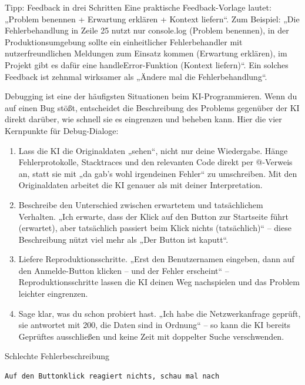 \begin{tcbinfo}{Tipp: Feedback in drei Schritten}
Eine praktische Feedback-Vorlage lautet: „Problem benennen + Erwartung erklären + Kontext liefern“. Zum Beispiel: „Die Fehlerbehandlung in Zeile 25 nutzt nur console.log (Problem benennen), in der Produktionsumgebung sollte ein einheitlicher Fehlerbehandler mit nutzerfreundlichen Meldungen zum Einsatz kommen (Erwartung erklären), im Projekt gibt es dafür eine handleError-Funktion (Kontext liefern)“. Ein solches Feedback ist zehnmal wirksamer als „Ändere mal die Fehlerbehandlung“.

\end{tcbinfo}


Debugging ist eine der häufigsten Situationen beim KI-Programmieren. Wenn du auf einen Bug stößt, entscheidet die Beschreibung des Problems gegenüber der KI direkt darüber, wie schnell sie es eingrenzen und beheben kann. Hier die vier Kernpunkte für Debug-Dialoge:

\begin{enumerate}
  \item Lass die KI die Originaldaten „sehen“, nicht nur deine Wiedergabe. Hänge Fehlerprotokolle, Stacktraces und den relevanten Code direkt per @-Verweis an, statt sie mit „da gab's wohl irgendeinen Fehler“ zu umschreiben. Mit den Originaldaten arbeitet die KI genauer als mit deiner Interpretation.
  \item Beschreibe den Unterschied zwischen erwartetem und tatsächlichem Verhalten. „Ich erwarte, dass der Klick auf den Button zur Startseite führt (erwartet), aber tatsächlich passiert beim Klick nichts (tatsächlich)“ – diese Beschreibung nützt viel mehr als „Der Button ist kaputt“.
  \item Liefere Reproduktionsschritte. „Erst den Benutzernamen eingeben, dann auf den Anmelde-Button klicken – und der Fehler erscheint“ – Reproduktionsschritte lassen die KI deinen Weg nachspielen und das Problem leichter eingrenzen.
  \item Sage klar, was du schon probiert hast. „Ich habe die Netzwerkanfrage geprüft, sie antwortet mit 200, die Daten sind in Ordnung“ – so kann die KI bereits Geprüftes ausschließen und keine Zeit mit doppelter Suche verschwenden.
\end{enumerate}

Schlechte Fehlerbeschreibung

\begin{lstlisting}
Auf den Buttonklick reagiert nichts, schau mal nach
\end{lstlisting}

